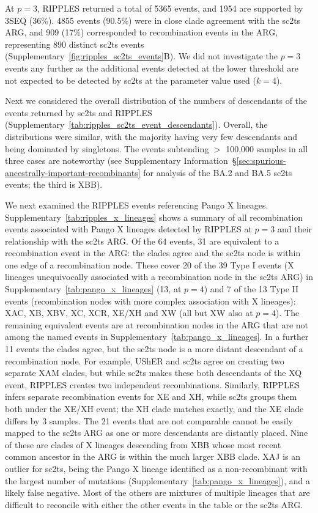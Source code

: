 \documentclass[12pt]{article}
\newcommand{\supref}[1]{Supplementary Information~\S\ref{#1}}
\newcommand{\siref}[1]{Supplementary~\ref{#1}}
\begin{document}
At $p=3$, RIPPLES returned a total of 5365 events, and
1954 are supported by 3SEQ (36\%). 4855 events
(90.5\%) were in close clade agreement with the sc2ts ARG,
and 909 (17\%) corresponded to recombination events in the ARG,
representing 890 distinct sc2ts events
(\siref{fig:ripples_sc2ts_events}B).
We did not investigate the $p=3$ events any further as the additional
events detected at the lower threshold are not expected to be detected
by sc2ts at the parameter value used ($k=4$).

Next we considered the overall distribution of the numbers of descendants
of the events returned by sc2ts and RIPPLES
(\siref{tab:ripples_sc2ts_event_descendants}).
Overall, the distributions were similar, with the majority having
very few descendants and being dominated by singletons.
The events subtending $>$ 100,000 samples
in all three cases are noteworthy (see
\supref{sec:spurious-ancestrally-important-recombinants}
for analysis of the BA.2 and BA.5 sc2ts events; the third is XBB).


We next examined the RIPPLES events referencing Pango X lineages.
\siref{tab:ripples_x_lineages} shows a summary of all
recombination events associated with Pango X lineages detected by RIPPLES
at $p=3$ and their relationship with the sc2ts ARG.
Of the 64 events, 31 are equivalent to a recombination event in the ARG:
the clades agree and the sc2ts node is within one edge of a recombination node.
These cover 20 of the 39 Type I events (X lineages unequivocally associated with
a recombination node in the sc2ts ARG) in \siref{tab:pango_x_lineages}
(13, at $p=4$) and
7 of the 13 Type II events
(recombination nodes with more complex association with X lineages):
XAC, XB, XBV, XC, XCR, XE/XH and XW (all but XW also at $p=4$).
The remaining equivalent events are at recombination nodes in the ARG
that are not among the named events in \siref{tab:pango_x_lineages}.
In a further 11 events the clades agree, but the sc2ts node is a more distant
descendant of a recombination node.
For example, UShER and sc2ts agree on creating two separate XAM clades, but while sc2ts
makes these both descendants of the XQ event,
RIPPLES creates two independent recombinations.
Similarly, RIPPLES infers separate recombination events for XE and XH,
while sc2ts groups them both under the XE/XH event; the XH clade matches
exactly, and the XE clade differs by 3 samples.
The 21 events that are not comparable
cannot be easily mapped
to the sc2ts ARG as one or more descendants are distantly placed.
Nine of these are clades of X lineages descending from XBB
whose most recent common ancestor in the ARG is within the much larger XBB clade.
XAJ is an outlier for sc2ts, being the Pango X lineage identified as a
non-recombinant with the largest number of mutations
(\siref{tab:pango_x_lineages}), and a likely false negative.
Most of the others are mixtures of multiple lineages that are
difficult to reconcile with either the other events in the table
or the sc2ts ARG.
\end{document}
